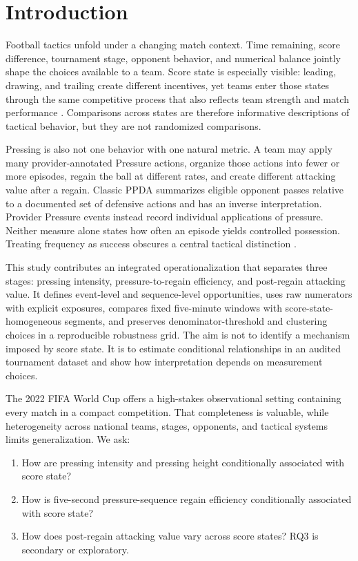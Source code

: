 \section{Introduction}

Football tactics unfold under a changing match context. Time remaining, score difference, tournament stage, opponent behavior, and numerical balance jointly shape the choices available to a team. Score state is especially visible: leading, drawing, and trailing create different incentives, yet teams enter those states through the same competitive process that also reflects team strength and match performance \citep{VERIFY_SCORE_STATE_REFERENCE}. Comparisons across states are therefore informative descriptions of tactical behavior, but they are not randomized comparisons.

Pressing is also not one behavior with one natural metric. A team may apply many provider-annotated Pressure actions, organize those actions into fewer or more episodes, regain the ball at different rates, and create different attacking value after a regain. Classic PPDA summarizes eligible opponent passes relative to a documented set of defensive actions and has an inverse interpretation. Provider Pressure events instead record individual applications of pressure. Neither measure alone states how often an episode yields controlled possession. Treating frequency as success obscures a central tactical distinction \citep{VERIFY_PPDA_REFERENCE,VERIFY_PRESSURE_EVENT_REFERENCE}.

This study contributes an integrated operationalization that separates three stages: pressing intensity, pressure-to-regain efficiency, and post-regain attacking value. It defines event-level and sequence-level opportunities, uses raw numerators with explicit exposures, compares fixed five-minute windows with score-state-homogeneous segments, and preserves denominator-threshold and clustering choices in a reproducible robustness grid. The aim is not to identify a mechanism imposed by score state. It is to estimate conditional relationships in an audited tournament dataset and show how interpretation depends on measurement choices.

The 2022 FIFA World Cup offers a high-stakes observational setting containing every match in a compact competition. That completeness is valuable, while heterogeneity across national teams, stages, opponents, and tactical systems limits generalization. We ask:

\begin{enumerate}
\item[\textbf{RQ1.}] How are pressing intensity and pressing height conditionally associated with score state?
\item[\textbf{RQ2.}] How is five-second pressure-sequence regain efficiency conditionally associated with score state?
\item[\textbf{RQ3.}] How does post-regain attacking value vary across score states? RQ3 is secondary or exploratory.
\end{enumerate}

